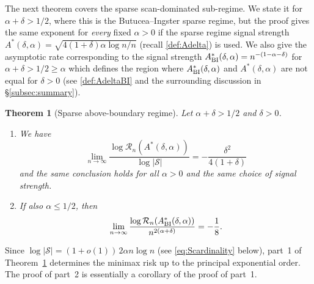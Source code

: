 \documentclass[11pt,reqno,letterpaper]{amsart}
\numberwithin{equation}{section}
\theoremstyle{plain}
\newtheorem{theorem}{Theorem}[section]
\newenvironment{thmbis}[1]
  {\renewcommand{\thethm}{\ref{#1}$'$}
   \addtocounter{theorem}{-1}
   \begin{theorem}}
  {\end{theorem}}
\begin{document}
The next theorem covers the sparse scan-dominated sub-regime. We state it for $\alpha + \delta > 1/2$, where this is the Butucea--Ingster sparse regime, but the proof gives the same exponent for {\em every} fixed $\alpha > 0$ if the sparse regime signal strength $A^\ast(\delta, \alpha) = \sqrt{4(1+\delta)\alpha\log n / n}$ (recall \eqref{def:Adelta}) is used. We also give the asymptotic rate corresponding to the signal strength $A^\ast_{{\rm BI}}(\delta, \alpha) = n^{-(1 - \alpha -\delta)}$ for 
$\alpha + \delta > 1/2 \ge \alpha$ which defines the region where $A^\ast_{{\rm BI}}(\delta, \alpha)$ and $A^\ast(\delta, \alpha)$ are not equal for $\delta > 0$ (see \eqref{def:AdeltaBI} and the surrounding discussion in \S\ref{subsec:summary}). 
\begin{theorem}[Sparse above-boundary regime]\label{thm:sparse_riskbnd}
Let $\alpha + \delta > 1/2$ and $\delta > 0$.
\begin{enumerate}
\item We have
\begin{equation}\label{eq:sparse_riskbnd}
\lim_{n\to\infty}
\frac{\log\mathcal R_n(A^\ast(\delta, \alpha))}{\log|\mathcal S|}
=-\frac{\delta^2}{4(1+\delta)}
\end{equation}
and the same conclusion holds for all $\alpha > 0$ and the same choice of signal 
strength.
\item If also $\alpha \le 1/2$, then
\begin{equation}\label{eq:dense_riskbnd2}
\lim_{n\to\infty}
\frac{\log \mathcal R_n(A^\ast_{{\rm BI}}(\delta, \alpha))}{n^{2(\alpha+\delta)}}
=-\frac18.
\end{equation}
\end{enumerate}
\end{theorem}

Since $\log|\mathcal S|=(1+o(1)) \, 2\alpha n\log n$ (see \eqref{eq:Scardinality} below), part~1 of Theorem~\ref{thm:sparse_riskbnd} determines the minimax risk up 
to the principal exponential order. The proof of part~2 is essentially a 
corollary of the proof of part~1.
\end{document}
